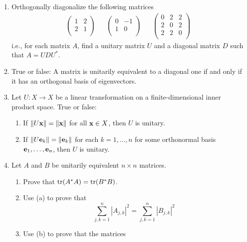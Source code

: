 \documentclass[../psets.tex]{subfiles}
\begin{document}
\begin{enumerate}[label={\textbf{6.\arabic*.}}]
    \item Orthogonally diagonalize the following matrices
    \begin{align*}
        \begin{pmatrix}
            1 & 2\\
            2 & 1\\
        \end{pmatrix}&&
        \begin{pmatrix}
            0 & -1\\
            1 & 0\\
        \end{pmatrix}&&
        \begin{pmatrix}
            0 & 2 & 2\\
            2 & 0 & 2\\
            2 & 2 & 0\\
        \end{pmatrix}
    \end{align*}
    i.e., for each matrix $A$, find a unitary matrix $U$ and a diagonal matrix $D$ such that $A=UDU^*$.
    \item True or false: A matrix is unitarily equivalent to a diagonal one if and only if it has an orthogonal basis of eigenvectors.
    \setcounter{enumi}{4}
    \item Let $U:X\to X$ be a linear transformation on a finite-dimensional inner product space. True or false:
    \begin{enumerate}
        \item If $\norm{U\mathbf{x}}=\norm{\mathbf{x}}$ for all $\mathbf{x}\in X$, then $U$ is unitary.
        \item If $\norm{U\mathbf{e}_k}=\norm{\mathbf{e}_k}$ for each $k=1,\dots,n$ for some orthonormal basis $\mathbf{e}_1,\dots,\mathbf{e}_n$, then $U$ is unitary.
    \end{enumerate}
    \item Let $A$ and $B$ be unitarily equivalent $n\times n$ matrices.
    \begin{enumerate}
        \item Prove that $\trace(A^*A)=\trace(B^*B)$.
        \item Use (a) to prove that
        \begin{equation*}
            \sum_{j,k=1}^n|A_{j,k}|^2 = \sum_{j,k=1}^n|B_{j,k}|^2
        \end{equation*}
        \item Use (b) to prove that the matrices

\end{enumerate}
\end{enumerate}
\end{document}
